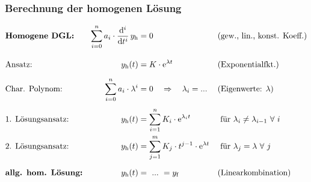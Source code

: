 \subsubsection{Berechnung der homogenen Lösung}
\label{sec:grundlagen:dgl:homogeneloesung}
\begin{frame}\ftx{\subsubsecname}
\b{%
    \begin{align}
        &\textbf{Homogene DGL:}& 
            \sum_{i=0}^{n} a_i \cdot \dt[i]\, y_{\mathrm{h}} &= 0 &
            &\text{(gew., lin., konst. Koeff.)}\vphantom{\bigg|}\\[4pt]
        &\text{Ansatz:}&
            y_{\mathrm{h}}(t) &= K \cdot \mathrm{e}^{\lambda t} &
            &\text{(Exponentialfkt.)}\vphantom{\bigg|}\\
        &\text{Char. Polynom:}&
            \sum_{i=0}^{n} a_i \cdot \lambda^i &= 0 \quad\Rightarrow\quad \lambda_i = ... &
            &\text{(Eigenwerte: $\lambda$)} \\[4pt]
        &\text{1. Lösungsansatz:}&
            y_{\mathrm{h}}(t) &= \sum_{i=1}^{n} K_i \cdot \mathrm{e}^{\lambda_i t} &
            &\text{ für $\lambda_i \neq \lambda_{i-1} \ \forall \ i$} \\
        &\text{2. Lösungsansatz:}&
            y_{\mathrm{h}}(t)&= \sum_{j=1}^{m} K_j \cdot t^{j-1}  \cdot \mathrm{e}^{\lambda t} &
            &\text{ für $\lambda_j = \lambda \ \forall \ j$}\\[6pt]
        &\textbf{allg. hom. Lösung:}&
            y_{\mathrm{h}}(t)&= \ ... \ = y_{\mathrm{f}} &
            &\text{(Linearkombination)}
    \end{align}
}%
\end{frame}

